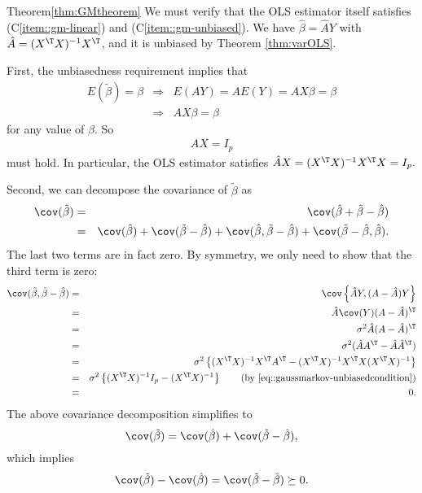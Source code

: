 \begin{myproof}{Theorem}{\ref{thm:GMtheorem}}
We must verify that the OLS estimator itself satisfies (C\ref{item::gm-linear}) and (C\ref{item::gm-unbiased}). We have $\hat{\beta}=\hat{A}Y$ with  $\hat{A}=(X^{\T}X)^{-1}X^{\T}$, and it is unbiased by Theorem \ref{thm:varOLS}. 

First, the unbiasedness requirement implies that
\begin{eqnarray*}
E(\tilde{\beta}) =\beta & \Longrightarrow & E(AY)=AE(Y)=AX\beta=\beta \\
&\Longrightarrow & AX\beta=\beta
\end{eqnarray*}
 for any value of $\beta$. So 
\begin{eqnarray}\label{eq::gaussmarkov-unbiasedcondition}
 AX=I_{p}
\end{eqnarray}
 must hold. In particular,
the OLS estimator satisfies $\hat{A}X = (X^{\T}X)^{-1}X^{\T} X =I_{p}.$

Second, we can decompose the covariance of $\tilde{\beta}$ as
\begin{eqnarray*}
\cov(\tilde{\beta}) 
&=& \cov(\hat{\beta} + \tilde{\beta} - \hat{\beta} ) \\
&=&  \cov(\hat{\beta} )  + \cov ( \tilde{\beta} - \hat{\beta} ) 
+ \cov(\hat{\beta} ,  \tilde{\beta} - \hat{\beta})   +  \cov(   \tilde{\beta} - \hat{\beta}, \hat{\beta}) .
\end{eqnarray*}
The last two terms are in fact zero. By symmetry, we only need to
show that the third term is zero:
\begin{eqnarray*}
  \cov(\hat{\beta} ,  \tilde{\beta} - \hat{\beta})   
& = &\cov\left\{ \hat{A}Y,(A-\hat{A})Y\right\} \\
 & =&\hat{A}\cov(Y)(A-\hat{A})^{\T}\\
 & =&\sigma^{2}\hat{A}(A-\hat{A})^{\T}\\
 & =&\sigma^{2}(\hat{A}A^{\T}-\hat{A}\hat{A}^{\T})\\
 & =&\sigma^{2}\left\{ (X^{\T}X)^{-1}X^{\T}A^{\T}-(X^{\T}X)^{-1}X^{\T}X(X^{\T}X)^{-1}\right\} \\
 & =&\sigma^{2}\left\{ (X^{\T}X)^{-1}I_{p}-(X^{\T}X)^{-1}\right\}  \qquad (\text{by } \eqref{eq::gaussmarkov-unbiasedcondition}) \\
 & =&0.
\end{eqnarray*}
The above covariance decomposition simplifies to
\[
\cov(\tilde{\beta})= \cov(\hat{\beta} )  + \cov ( \tilde{\beta} - \hat{\beta} )  , 
\]
which implies 
\[
\cov(\tilde{\beta})-\cov(\hat{\beta}) = \cov(\tilde{\beta} - \hat{\beta}) \succeq 0. 
\]
\end{myproof}




